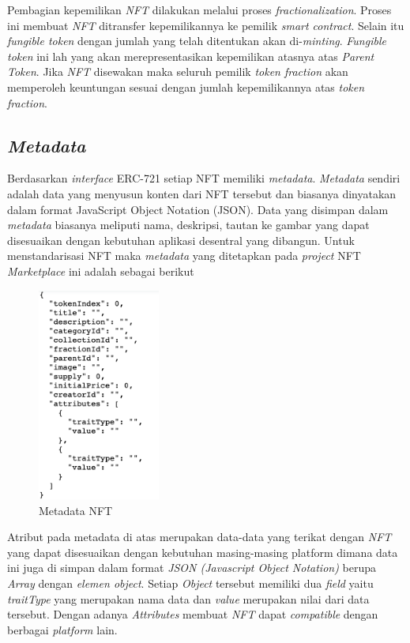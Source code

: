 Pembagian kepemilikan \emph{NFT} dilakukan melalui proses \emph{fractionalization}. Proses ini membuat \emph{NFT} ditransfer kepemilikannya ke pemilik \emph{smart contract}. Selain itu \emph{fungible token} dengan jumlah yang telah ditentukan akan di-\emph{minting}. \emph{Fungible token} ini lah yang akan merepresentasikan kepemilikan atasnya atas \emph{Parent Token}. Jika \emph{NFT} disewakan maka seluruh pemilik \emph{token fraction} akan memperoleh keuntungan sesuai dengan jumlah kepemilikannya atas \emph{token fraction}.

\subsection{\emph{Metadata}}

Berdasarkan \emph{interface} ERC-721 setiap NFT memiliki \emph{metadata}. \emph{Metadata} sendiri adalah data yang menyusun konten dari NFT tersebut dan biasanya dinyatakan dalam format JavaScript Object Notation (JSON). Data yang disimpan dalam \emph{metadata} biasanya meliputi nama, deskripsi, tautan ke gambar yang dapat disesuaikan dengan kebutuhan aplikasi desentral yang dibangun. Untuk menstandarisasi NFT maka \emph{metadata} yang ditetapkan pada \emph{project} NFT \emph{Marketplace} ini adalah sebagai berikut

\begin{figure} [H] \centering
  \includegraphics[height=7cm]{gambar/img-metadata.png}
  \caption{Metadata NFT}
  \label{fig:MetadataNFT}
\end{figure}

Atribut pada metadata di atas merupakan data-data yang terikat dengan \emph{NFT} yang dapat disesuaikan dengan kebutuhan masing-masing platform dimana data ini juga di simpan dalam format \emph{JSON (Javascript Object Notation)} berupa \emph{Array} dengan \emph{elemen object}. Setiap \emph{Object} tersebut memiliki dua \emph{field} yaitu \emph{traitType} yang merupakan nama data dan \emph{value} merupakan nilai dari data tersebut. Dengan adanya \emph{Attributes} membuat \emph{NFT} dapat \emph{compatible} dengan berbagai \emph{platform} lain.

